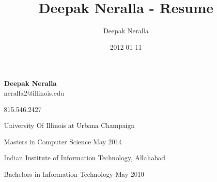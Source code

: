 \documentclass[letterpaper,10pt]{article}
\title{Deepak Neralla - Resume}
\author{Deepak Neralla}
\date{2012-01-11}
\begin{document}
\renewcommand{\section}[1]{
	\noindent{\raisebox{-5pt}{\bfseries {#1}}}
}

\renewcommand{\date}[1]{
	\hfill {#1}\ignorespacesafterend
}

\newcommand{\personal}[1]{
	{#1}
}

\newenvironment{reslist}
{ \begin{itemize}
	\setlength{\topsep}{0pt}
	\setlength{\itemsep}{0pt}
	\setlength{\parskip}{0pt}
	\setlength{\parsep}{0pt}
	\setlength{\partopsep}{0pt}}
{\end{itemize}}

\newenvironment{resdescription}
{\begin{description}
	\setlength{\itemindent}{-20pt}
	\setlength{\labelsep}{20pt}
	\setlength{\topsep}{0pt}
	\setlength{\itemsep}{0pt}
	\setlength{\parskip}{0pt}
	\setlength{\parsep}{0pt}
	\setlength{\partopsep}{0pt}}
{\end{description}}

\pagestyle{empty}


\begin{center}
{\Large \bf Deepak Neralla}\\
\personal{{neralla2@illinois.edu}} 

\personal{{815.546.2427}}
\end{center}

\noindent\hrulefill



\section{Education}

\begin{resdescription}
	\item[] { University Of Illinois at Urbana Champaign}
	\begin{resdescription}
		\item[] { Masters in Computer Science   \date{May 2014}
		}
	 \end{resdescription}
		\item[] {Indian Institute of Information Technology, Allahabad}
	 \begin{resdescription}
		\item[] { Bachelors in Information Technology  \date{May 2010}
			
		}
	 \end{resdescription}
\end{resdescription}
\end{document}

